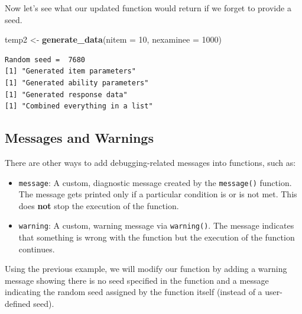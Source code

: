 \documentclass[
]{book}
\newenvironment{Shaded}{\begin{snugshade}}{\end{snugshade}}
\newcommand{\DataTypeTok}[1]{\textcolor[rgb]{0.13,0.29,0.53}{#1}}
\newcommand{\DecValTok}[1]{\textcolor[rgb]{0.00,0.00,0.81}{#1}}
\newcommand{\KeywordTok}[1]{\textcolor[rgb]{0.13,0.29,0.53}{\textbf{#1}}}
\newcommand{\NormalTok}[1]{#1}
\newcommand{\StringTok}[1]{\textcolor[rgb]{0.31,0.60,0.02}{#1}}
\providecommand{\tightlist}{%
  \setlength{\itemsep}{0pt}\setlength{\parskip}{0pt}}
\begin{document}
Now let's see what our updated function would return if we forget to provide a seed.

\begin{Shaded}
\begin{Highlighting}[]
\NormalTok{temp2 <-}\StringTok{ }\KeywordTok{generate_data}\NormalTok{(}\DataTypeTok{nitem =} \DecValTok{10}\NormalTok{, }\DataTypeTok{nexaminee =} \DecValTok{1000}\NormalTok{)}
\end{Highlighting}
\end{Shaded}

\begin{verbatim}
Random seed =  7680 
[1] "Generated item parameters"
[1] "Generated ability parameters"
[1] "Generated response data"
[1] "Combined everything in a list"
\end{verbatim}

\hypertarget{messages-and-warnings}{%
\subsection{Messages and Warnings}\label{messages-and-warnings}}

There are other ways to add debugging-related messages into functions, such as:

\begin{itemize}
\tightlist
\item
  \texttt{message}: A custom, diagnostic message created by the \texttt{message()} function. The message gets printed only if a particular condition is or is not met. This does \textbf{not} stop the execution of the function.
\item
  \texttt{warning}: A custom, warning message via \texttt{warning()}. The message indicates that something is wrong with the function but the execution of the function continues.
\end{itemize}

Using the previous example, we will modify our function by adding a warning message showing there is no seed specified in the function and a message indicating the random seed assigned by the function itself (instead of a user-defined seed).
\end{document}
